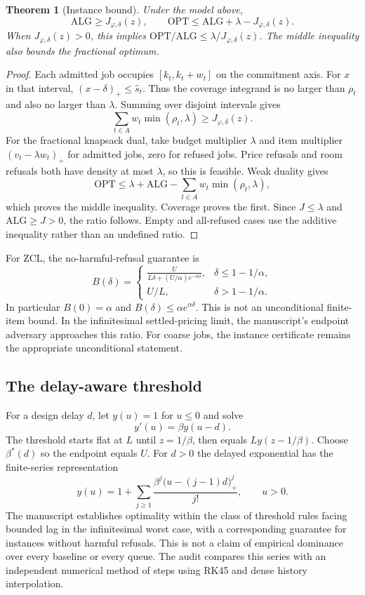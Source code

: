 \documentclass[11pt]{article}
\newtheorem{theorem}{Theorem}\newtheorem{proposition}{Proposition}
\newcommand{\ALG}{\mathrm{ALG}}\newcommand{\OPT}{\mathrm{OPT}}
\begin{document}
\begin{theorem}[Instance bound]
Under the model above,
\[\ALG\ge J_{\varphi,\delta}(z),\qquad
\OPT\le\ALG+\lambda-J_{\varphi,\delta}(z).\]
When $J_{\varphi,\delta}(z)>0$, this implies $\OPT/\ALG\le\lambda/J_{\varphi,\delta}(z)$. The middle inequality also bounds the fractional optimum.
\end{theorem}
\begin{proof}
Each admitted job occupies $[k_t,k_t+w_t]$ on the commitment axis. For $x$ in that interval, $(x-\delta)_+\le\widehat s_t$. Thus the coverage integrand is no larger than $\rho_t$ and also no larger than $\lambda$. Summing over disjoint intervals gives
\[\sum_{t\in A}w_t\min(\rho_t,\lambda)\ge J_{\varphi,\delta}(z).\]
For the fractional knapsack dual, take budget multiplier $\lambda$ and item multiplier $(v_t-\lambda w_t)_+$ for admitted jobs, zero for refused jobs. Price refusals and room refusals both have density at most $\lambda$, so this is feasible. Weak duality gives
\[\OPT\le\lambda+\ALG-\sum_{t\in A}w_t\min(\rho_t,\lambda),\]
which proves the middle inequality. Coverage proves the first. Since $J\le\lambda$ and $\ALG\ge J>0$, the ratio follows. Empty and all-refused cases use the additive inequality rather than an undefined ratio.
\end{proof}

For ZCL, the no-harmful-refusal guarantee is
\[ B(\delta)=\begin{cases}
\displaystyle\frac{U}{L\delta+(U/\alpha)e^{-\alpha\delta}},&\delta\le1-1/\alpha,\\
U/L,&\delta>1-1/\alpha.
\end{cases}\]
In particular $B(0)=\alpha$ and $B(\delta)\le\alpha e^{\alpha\delta}$. This is not an unconditional finite-item bound. In the infinitesimal settled-pricing limit, the manuscript's endpoint adversary approaches this ratio. For coarse jobs, the instance certificate remains the appropriate unconditional statement.

\subsection{The delay-aware threshold}
For a design delay $d$, let $y(u)=1$ for $u\le0$ and solve
\[y'(u)=\beta y(u-d).\]
The threshold starts flat at $L$ until $z=1/\beta$, then equals $L y(z-1/\beta)$. Choose $\beta^*(d)$ so the endpoint equals $U$. For $d>0$ the delayed exponential has the finite-series representation
\[y(u)=1+\sum_{j\ge1}\frac{\beta^j\bigl(u-(j-1)d\bigr)_+^j}{j!},\qquad u>0.\]
The manuscript establishes optimality within the class of threshold rules facing bounded lag in the infinitesimal worst case, with a corresponding guarantee for instances without harmful refusals. This is not a claim of empirical dominance over every baseline or every queue. The audit compares this series with an independent numerical method of steps using RK45 and dense history interpolation.
\end{document}
